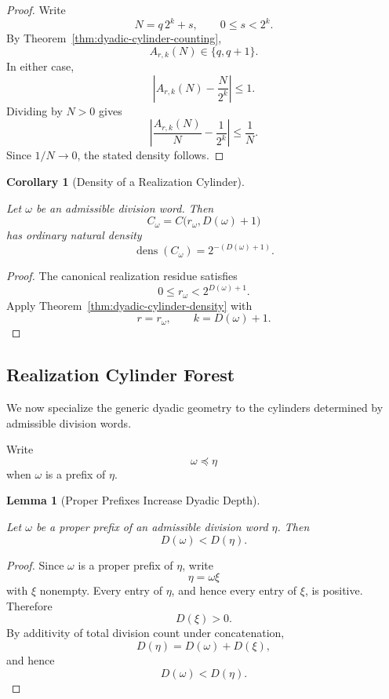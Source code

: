 \documentclass[12pt, oneside]{article}
\numberwithin{equation}{section}
\theoremstyle{definition}
\theoremstyle{plain}
\newtheorem{lemma}[theorem]{Lemma}
\newtheorem{corollary}[theorem]{Corollary}
\theoremstyle{remark}
\begin{document}
\begin{proof}
Write
\[
N=q\,2^k+s,
\qquad
0\le s<2^k.
\]
By Theorem~\ref{thm:dyadic-cylinder-counting},
\[
A_{r,k}(N)\in\{q,q+1\}.
\]
In either case,
\[
\left|
A_{r,k}(N)-\frac{N}{2^k}
\right|
\le1.
\]
Dividing by \(N>0\) gives
\[
\left|
\frac{A_{r,k}(N)}{N}
-
\frac{1}{2^k}
\right|
\le
\frac1N.
\]
Since \(1/N\to0\), the stated density follows.
\end{proof}

\begin{corollary}[Density of a Realization Cylinder]
\label{cor:realization-cylinder-density}

Let \(\omega\) be an admissible division word. Then
\[
C_\omega
=
C\bigl(r_\omega,D(\omega)+1\bigr)
\]
has ordinary natural density
\[
\boxed{
\operatorname{dens}(C_\omega)
=
2^{-(D(\omega)+1)}.
}
\]
\end{corollary}

\begin{proof}
The canonical realization residue satisfies
\[
0\le r_\omega<2^{D(\omega)+1}.
\]
Apply Theorem~\ref{thm:dyadic-cylinder-density} with
\[
r=r_\omega,
\qquad
k=D(\omega)+1.
\]
\end{proof}

\subsection{Realization Cylinder Forest}

We now specialize the generic dyadic geometry to the cylinders determined
by admissible division words.

Write
\[
\omega\preceq\eta
\]
when \(\omega\) is a prefix of \(\eta\).

\begin{lemma}[Proper Prefixes Increase Dyadic Depth]
\label{lem:proper-prefix-division-count}

Let \(\omega\) be a proper prefix of an admissible division word \(\eta\).
Then
\[
D(\omega)<D(\eta).
\]
\end{lemma}

\begin{proof}
Since \(\omega\) is a proper prefix of \(\eta\), write
\[
\eta=\omega\xi
\]
with \(\xi\) nonempty. Every entry of \(\eta\), and hence every entry of
\(\xi\), is positive. Therefore
\[
D(\xi)>0.
\]
By additivity of total division count under concatenation,
\[
D(\eta)=D(\omega)+D(\xi),
\]
and hence
\[
D(\omega)<D(\eta).
\]
\end{proof}
\end{document}
